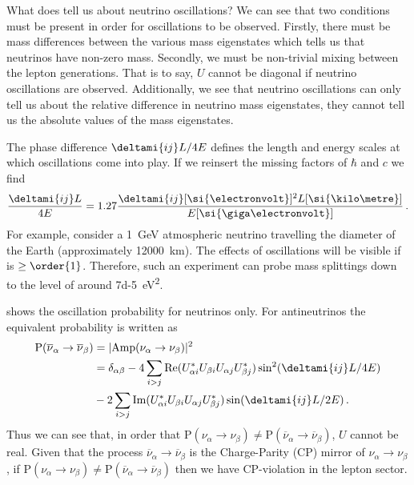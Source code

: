 What does  tell us about neutrino oscillations?
We can see that two conditions must be present in order for oscillations to be observed.
Firstly, there must be mass differences between the various mass eigenstates which tells us that neutrinos have non-zero mass.
Secondly, we must be non-trivial mixing between the lepton generations.
That is to say, $U$ cannot be diagonal if neutrino oscillations are observed.
Additionally, we see that neutrino oscillations can only tell us about the relative difference in neutrino mass eigenstates, they cannot tell us the absolute values of the mass eigenstates.

The phase difference $\deltami{ij}L/4E$ defines the length and energy scales at which oscillations come into play.
If we reinsert the missing factors of $\hbar$ and $c$ we find
\begin{equation}
  \frac{ \deltami{ij} L }{ 4E } = 1.27 \frac{ \deltami{ij} [\si{\electronvolt}]^{2} L [\si{\kilo\metre}]}{ E [\si{\giga\electronvolt}] } \, .
  \label{eq:phaseDiff}
\end{equation}
For example, consider a \SI{1}{\giga\electronvolt} atmospheric neutrino travelling the diameter of the Earth (approximately \SI{12000}{\kilo\metre}).
The effects of oscillations will be visible if  is $\geq \order{1}$.
Therefore, such an experiment can probe mass splittings down to the level of around \SI{7d-5}{\electronvolt\squared}.

 shows the oscillation probability for neutrinos only.
For antineutrinos the equivalent probability is written as
\begin{align}
  \text{P}(\overline{\nu}_{\alpha} \rightarrow \overline{\nu}_{\beta}) &= | \text{Amp}(\nu_{\alpha} \rightarrow \nu_{\beta}) |^{2} \nonumber \\
  &= \delta_{\alpha \beta} - 4 \sum_{i > j} \text{Re}( U^{*}_{\alpha i} U_{\beta i} U_{\alpha j} U^{*}_{\beta j} ) \sin^{2}(\deltami{ij}L/4E) \nonumber \\
  & - 2 \sum_{i>j} \text{Im}( U^{*}_{\alpha i} U_{\beta i} U_{\alpha j} U^{*}_{\beta j} ) \sin (\deltami{ij}L/2E) \, .
\end{align}
Thus we can see that, in order that $\text{P}(\nu_{\alpha} \rightarrow \nu_{\beta}) \neq \text{P}(\overline{\nu}_{\alpha} \rightarrow \overline{\nu}_{\beta})$, $U$ cannot be real.
Given that the process $\overline{\nu}_{\alpha} \rightarrow \overline{\nu}_{\beta}$ is the Charge-Parity (CP) mirror of $\nu_{\alpha} \rightarrow \nu_{\beta}$, if $\text{P}(\nu_{\alpha} \rightarrow \nu_{\beta}) \neq \text{P}(\overline{\nu}_{\alpha} \rightarrow \overline{\nu}_{\beta})$ then we have CP-violation in the lepton sector.

